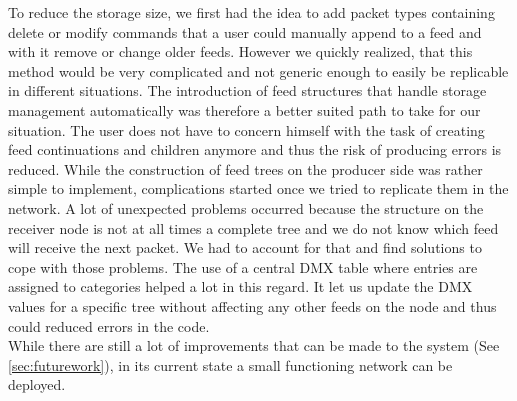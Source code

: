 To reduce the storage size, we first had the idea to add packet types containing delete or modify commands that a user could manually append to a feed and with it remove or change older feeds. However we quickly realized, that this method would be very complicated and not generic enough to easily be replicable in different situations. The introduction of feed structures that handle storage management automatically was therefore a better suited path to take for our situation. The user does not have to concern himself with the task of creating feed continuations and children anymore and thus the risk of producing errors is reduced. While the construction of feed trees on the producer side was rather simple to implement, complications started once we tried to replicate them in the network. A lot of unexpected problems occurred because the structure on the receiver node is not at all times a complete tree and we do not know which feed will receive the next packet. We had to account for that and find solutions to cope with those problems. The use of a central DMX table where entries are assigned to categories helped a lot in this regard. It let us update the DMX values for a specific tree without affecting any other feeds on the node and thus could reduced errors in the code. \\
While there are still a lot of improvements that can be made to the system (See \cref{sec:futurework}), in its current state a small functioning network can be deployed.

